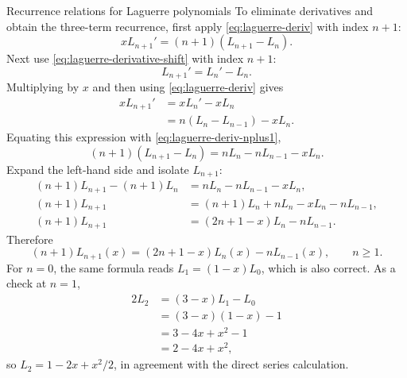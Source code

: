 \documentclass[11pt]{beamer}
\begin{document}
\begin{frame}[allowframebreaks]{Recurrence relations for Laguerre polynomials}
To eliminate derivatives and obtain the three-term recurrence, first apply
\eqref{eq:laguerre-deriv} with index $n+1$:
\begin{equation}
  xL_{n+1}'=(n+1)(L_{n+1}-L_n).
  \label{eq:laguerre-deriv-nplus1}
\end{equation}
Next use \eqref{eq:laguerre-derivative-shift} with index $n+1$:
\[
  L_{n+1}'=L_n'-L_n.
\]
Multiplying by $x$ and then using \eqref{eq:laguerre-deriv} gives
\begin{align*}
  xL_{n+1}'
   &=xL_n'-xL_n\\
   &=n(L_n-L_{n-1})-xL_n.
\end{align*}
Equating this expression with \eqref{eq:laguerre-deriv-nplus1},
\[
  (n+1)(L_{n+1}-L_n)
    =nL_n-nL_{n-1}-xL_n.
\]
Expand the left-hand side and isolate $L_{n+1}$:
\begin{align*}
  (n+1)L_{n+1}-(n+1)L_n
    &=nL_n-nL_{n-1}-xL_n,\\
  (n+1)L_{n+1}
    &=(n+1)L_n+nL_n-xL_n-nL_{n-1},\\
  (n+1)L_{n+1}
    &=(2n+1-x)L_n-nL_{n-1}.
\end{align*}
Therefore
\begin{equation}
  (n+1)L_{n+1}(x)
    =(2n+1-x)L_n(x)-nL_{n-1}(x),
  \qquad n\ge1.
  \label{eq:laguerre-three-term}
\end{equation}
For $n=0$, the same formula reads
$L_1=(1-x)L_0$, which is also correct.  As a check at $n=1$,
\begin{align*}
  2L_2
   &=(3-x)L_1-L_0\\
   &=(3-x)(1-x)-1\\
   &=3-4x+x^2-1\\
   &=2-4x+x^2,
\end{align*}
so $L_2=1-2x+x^2/2$, in agreement with the direct series calculation.
\end{frame}
\end{document}

